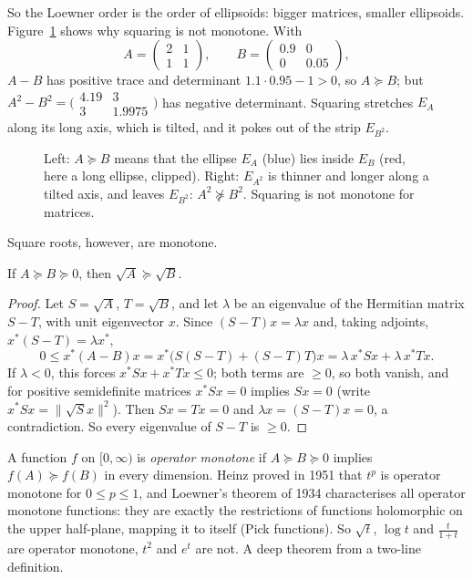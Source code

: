 So the Loewner order is the order of ellipsoids: bigger matrices, smaller ellipsoids. Figure~\ref{linear:fig:loewner} shows why squaring is
not monotone. With
\[
A=\begin{pmatrix}2&1\\1&1\end{pmatrix},\qquad B=\begin{pmatrix}0.9&0\\0&0.05\end{pmatrix},
\]
$A-B$ has positive trace and determinant $1.1\cdot0.95-1>0$, so $A\succeq B$; but $A^2-B^2=\bigl(\begin{smallmatrix}4.19&3\\3&1.9975
\end{smallmatrix}\bigr)$ has negative determinant. Squaring stretches $E_A$ along its long axis, which is tilted, and it pokes out of
the strip $E_{B^2}$.

\begin{figure}[ht]
\centering
{}
\caption{Left: $A\succeq B$ means that the ellipse $E_A$ (blue) lies inside $E_B$ (red, here a long ellipse, clipped). Right:
$E_{A^2}$ is thinner and longer along a tilted axis, and leaves $E_{B^2}$: $A^2\not\succeq B^2$. Squaring is not monotone for matrices.}
\label{linear:fig:loewner}
\end{figure}

Square roots, however, are monotone.

\begin{theorem}\label{linear:thm:sqrtmonotone}
If $A\succeq B\succeq0$, then $\sqrt A\succeq\sqrt B$.
\end{theorem}
\begin{proof}
Let $S=\sqrt A$, $T=\sqrt B$, and let $\lambda$ be an eigenvalue of the Hermitian matrix $S-T$, with unit eigenvector $x$. Since
$(S-T)x=\lambda x$ and, taking adjoints, $x^*(S-T)=\lambda x^*$,
\[
0\le x^*(A-B)x=x^*\bigl(S(S-T)+(S-T)T\bigr)x=\lambda\,x^*Sx+\lambda\,x^*Tx.
\]
If $\lambda<0$, this forces $x^*Sx+x^*Tx\le0$; both terms are $\ge0$, so both vanish, and for positive semidefinite matrices
$x^*Sx=0$ implies $Sx=0$ (write $x^*Sx=\|\sqrt Sx\|^2$). Then $Sx=Tx=0$ and $\lambda x=(S-T)x=0$, a contradiction. So every eigenvalue
of $S-T$ is $\ge0$.
\end{proof}

\begin{remark}
A function $f$ on $[0,\infty)$ is \emph{operator monotone} if $A\succeq B\succeq0$ implies $f(A)\succeq f(B)$ in every dimension. Heinz
proved in 1951 that $t^p$ is operator monotone for $0\le p\le1$, and Loewner's theorem of 1934 characterises all operator monotone
functions: they are exactly the restrictions of functions holomorphic on the upper half-plane, mapping it to itself (Pick functions).
So $\sqrt t$, $\log t$ and $\frac t{1+t}$ are operator monotone, $t^2$ and $e^t$ are not. A deep theorem from a two-line definition.
\end{remark}

